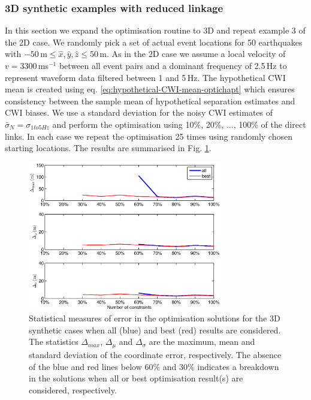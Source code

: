 \documentclass[extra]{gji}
\begin{document}
\subsubsection{3D synthetic examples with reduced linkage}

In this section we expand the optimisation routine to 3D and repeat example 3 of the 2D case.
We randomly pick a set of actual event locations for 50 earthquakes with
$-50$\,m$\leq \hat{x},\hat{y},\hat{z} \leq 50$\,m. As in the 2D case we assume a local velocity
of $v=3300\,$ms$^{-1}$ between all event pairs and a dominant frequency of 2.5$\,$Hz to represent
 waveform data filtered between 1 and 5$\,$Hz.
The hypothetical CWI mean is created using eq. \ref{eq:hypothetical-CWI-mean-optichapt}
which ensures consistency between the sample mean of hypothetical separation estimates and CWI
biases. We use a standard deviation for the noisy CWI estimates
of $\bar{\sigma}_N = \sigma_{1to5Hz}$ and perform the optimisation using 10\%,
20\%, ..., 100\% of the direct links.
In each case we repeat the
optimisation 25 times using randomly chosen starting locations. The results are
summarised in Fig. \ref{fig:optimisationresults-3Dsynth}.

\begin{figure}
\noindent\includegraphics[width = 20pc]{diags/ressummary_3Dsynth50eq.eps}
\caption{Statistical measures of error in the optimisation solutions for the 3D synthetic cases when all (blue)
and best (red) results are considered. The statistics $\Delta_{max}$, $\Delta_\mu$ and
$\Delta_\sigma$ are the maximum, mean and standard deviation of the coordinate error, respectively.
The absence of the blue and red lines below 60\% and 30\% indicates a breakdown in the solutions
when all or best optimisation result(s) are considered, respectively.}
\label{fig:optimisationresults-3Dsynth}
\end{figure}
\end{document}
